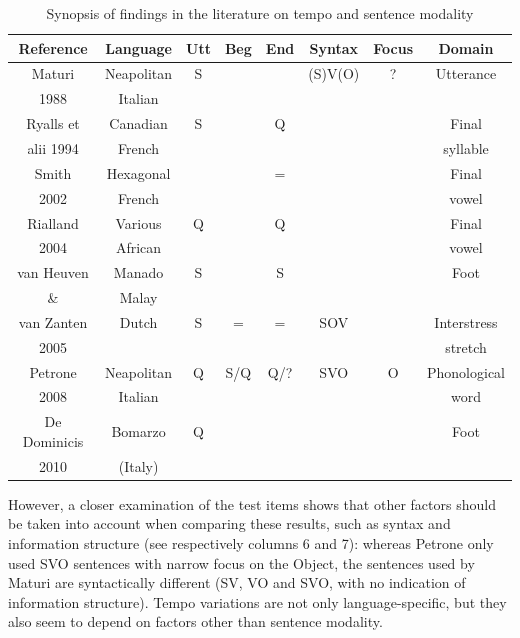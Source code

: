 \begin{landscape}
\begin{table}[p]
\centering
\begin{tabular}{c c c c c c c c}
Reference & Language & Utt & Beg & End & Syntax & Focus & Domain \\
\hline\hline
Maturi & Neapolitan & S & & & (S)V(O) & ? & Utterance\\
1988 & Italian & & & & & & \\
\hline
Ryalls et & Canadian & S & & Q & & & Final \\
alii 1994 & French & & & & & & syllable \\
\hline
Smith & Hexagonal & & & = & & & Final \\
2002 & French & & & & & & vowel \\
\hline
Rialland & Various & Q & & Q & & & Final \\
2004 & African & & & & & & vowel \\
\hline
van Heuven & Manado & S & & S & & & Foot \\
\& & Malay & & & & & & \\
van Zanten & Dutch & S & = & = & SOV & & Interstress \\
2005 & & & & & & & stretch \\
\hline
Petrone & Neapolitan & Q & S/Q & Q/? & SVO & O & Phonological \\
2008 & Italian & & & & & & word \\
\hline
De Dominicis & Bomarzo & Q & & & & & Foot \\
2010 & (Italy) & & & & & & \\
\end{tabular}
\caption{Synopsis of findings in the literature on tempo and sentence modality}
\label{tab41}\end{table}
\end{landscape}

However, a closer examination of the test items shows that other factors should be taken into account when comparing these results, such as syntax and information structure (see respectively columns 6 and 7): whereas Petrone only used SVO sentences with narrow focus on the Object, the sentences used by Maturi are syntactically different (SV, VO and SVO, with no indication of information structure). Tempo variations are not only language-specific, but they also seem to depend on factors other than sentence modality. 

